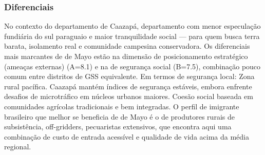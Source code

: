 \subsubsection*{Diferenciais}\label{dif-de-mayo-0611}
No contexto do departamento de Caazapá, departamento com menor especulação fundiária do sul paraguaio e maior tranquilidade social — para quem busca terra barata, isolamento real e comunidade campesina conservadora. Os diferenciais mais marcantes de de Mayo estão na dimensão de posicionamento estratégico (ameaças externas) (A=8.1) e na de segurança social (B=7.5), combinação pouco comum entre distritos de GSS equivalente. Em termos de segurança local: Zona rural pacífica. Caazapá mantém índices de segurança estáveis, embora enfrente desafios de microtráfico em núcleos urbanos maiores. Coesão social baseada em comunidades agrícolas tradicionais e bem integradas. O perfil de imigrante brasileiro que melhor se beneficia de de Mayo é o de produtores rurais de subsistência, off-gridders, pecuaristas extensivos, que encontra aqui uma combinação de custo de entrada acessível e qualidade de vida acima da média regional.
